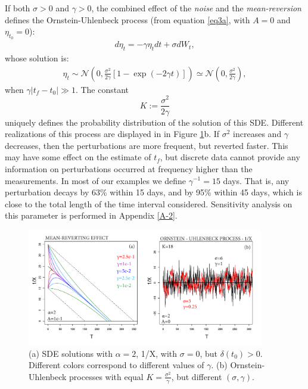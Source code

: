 \documentclass{article}
\begin{document}
If both $\sigma>0$ and $\gamma>0$, the combined effect of the {\it noise} and the {\it mean-reversion} defines the Ornstein-Uhlenbeck process (from equation \ref{eq3a}, with $A=0$ and $\eta_{t_0}=0$):
\begin{align}\label{eq4a}
d\eta_t=-\gamma\eta_t dt+\sigma dW_t,
\end{align}
whose solution is:
\begin{align}\label{eq4b}
\eta_t\sim\mathcal N\left(0,\frac{\sigma^2}{2\gamma}\left[1-\exp(-2\gamma t)\right]\right)\simeq \mathcal N\left(0,\frac{\sigma^2}{2\gamma}\right),
\end{align}
when $\gamma|t_f-t_0|\gg1$. The constant
$$K:=\frac{\sigma^2}{2\gamma}$$
uniquely defines the probability distribution of the solution of this SDE. Different realizations of this process are displayed in in Figure \ref{Fig3}b. If $\sigma^2$ increases and $\gamma$ decreases, then the perturbations are more frequent, but reverted faster. This may have some effect on the estimate of $t_f$, but discrete data cannot provide any information on perturbations occurred at frequency higher than the measurements. In most of our examples we define $\gamma^{-1}=15$ days. That is, any perturbation decays by 63\% within 15 days, and by 95\% within 45 days, which is close to the total length of the time interval considered. Sensitivity analysis on this parameter is performed in Appendix \ref{A-2}.

\begin{figure}[H]
\centering
\includegraphics[width=0.92\textwidth]{Fig3_plus.png}
\caption{(a) SDE solutions with $\alpha=2$, 1/X, with $\sigma=0$, but $\delta(t_0)>0$. Different colors correspond to different values of $\gamma$. (b) Ornstein-Uhlenbeck processes with equal $K=\frac{\sigma^2}{\gamma}$, but different $(\sigma, \gamma)$.}
\label{Fig3}
\end{figure}

\newpage
\end{document}
